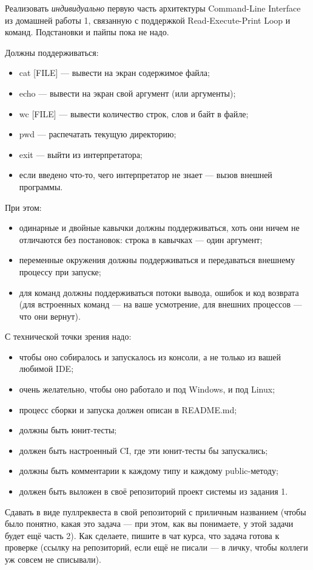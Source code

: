 \documentclass[a5paper]{homework}
\begin{document}

Реализовать \emph{индивидуально} первую часть архитектуры Command-Line Interface из домашней работы 1, связанную с поддержкой Read-Execute-Print Loop и команд. Подстановки и пайпы пока не надо.

Должны поддерживаться:

\begin{itemize}
    \item cat [FILE] --- вывести на экран содержимое файла;
    \item echo --- вывести на экран свой аргумент (или аргументы);
    \item wc [FILE] --- вывести количество строк, слов и байт в файле;
    \item pwd --- распечатать текущую директорию;
    \item exit --- выйти из интерпретатора;
    \item если введено что-то, чего интерпретатор не знает --- вызов внешней программы.
\end{itemize}

При этом:

\begin{itemize}
    \item одинарные и двойные кавычки должны поддерживаться, хоть они ничем не отличаются без постановок: строка в кавычках --- один аргумент;
    \item переменные окружения должны поддерживаться и передаваться внешнему процессу при запуске;
    \item для команд должны поддерживаться потоки вывода, ошибок и код возврата (для встроенных команд --- на ваше усмотрение, для внешних процессов --- что они вернут).
\end{itemize}

С технической точки зрения надо:

\begin{itemize}
    \item чтобы оно собиралось и запускалось из консоли, а не только из вашей любимой IDE;
    \item очень желательно, чтобы оно работало и под Windows, и под Linux;
    \item процесс сборки и запуска должен описан в README.md;
    \item должны быть юнит-тесты;
    \item должен быть настроенный CI, где эти юнит-тесты бы запускались;
    \item должны быть комментарии к каждому типу и каждому public-методу;
    \item должен быть выложен в своё репозиторий проект системы из задания 1.
\end{itemize}

Сдавать в виде пуллреквеста в свой репозиторий с приличным названием (чтобы было понятно, какая это задача --- при этом, как вы понимаете, у этой задачи будет ещё часть 2). Как сделаете, пишите в чат курса, что задача готова к проверке (ссылку на репозиторий, если ещё не писали --- в личку, чтобы коллеги уж совсем не списывали).
\end{document}
